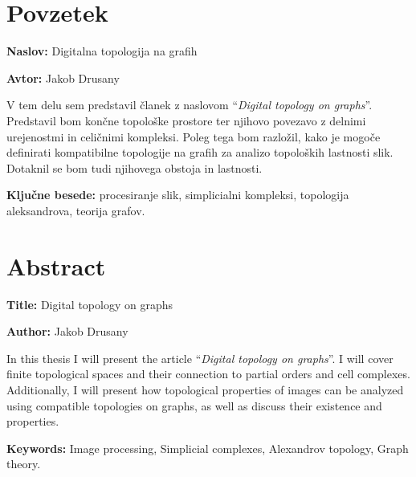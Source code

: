 \documentclass[a4paper, 12pt]{book}
\newcommand{\ttitle}{Digitalna topologija na grafih}
\newcommand{\ttitleEn}{Digital topology on graphs}
\newcommand{\tauthor}{Jakob Drusany}
\newcommand{\tkeywords}{procesiranje slik, simplicialni kompleksi, topologija aleksandrova, teorija grafov}
\newcommand{\tkeywordsEn}{Image processing, Simplicial complexes, Alexandrov topology, Graph theory}
\newcommand{\clearemptydoublepage}{\newpage{\pagestyle{empty}\cleardoublepage}}
\theoremstyle{definition}
\theoremstyle{remark}
\begin{document}

\chapter*{Povzetek}

\noindent\textbf{Naslov:} \ttitle
\bigskip

\noindent\textbf{Avtor:} \tauthor
\bigskip

\noindent V tem delu sem predstavil članek z naslovom ``\textit{Digital topology on graphs}''.   
Predstavil bom končne topološke prostore ter njihovo povezavo z delnimi
urejenostmi in celičnimi kompleksi. Poleg tega bom razložil, kako je mogoče
definirati kompatibilne topologije na grafih za analizo topoloških lastnosti slik.
Dotaknil se bom tudi njihovega obstoja in lastnosti.

\bigskip

\noindent\textbf{Ključne besede:} \tkeywords.
\clearemptydoublepage

\chapter*{Abstract}

\noindent\textbf{Title:} \ttitleEn
\bigskip

\noindent\textbf{Author:} \tauthor
\bigskip

\noindent In this thesis I will present the article ``\textit{Digital topology on graphs}''.
I will cover finite topological spaces and their connection to partial
orders and cell complexes. Additionally, I will present how topological
properties of images can be analyzed using compatible topologies on graphs, as well
as discuss their existence and properties.

\bigskip

\noindent\textbf{Keywords:} \tkeywordsEn.
\clearemptydoublepage
\fi
\mainmatter
\setcounter{page}{1}
\pagestyle{fancy}
\end{document}
